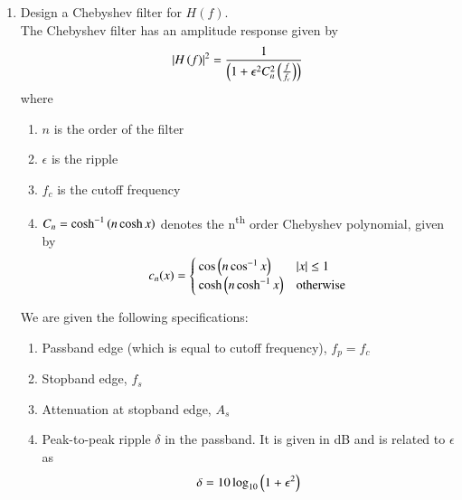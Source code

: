 \documentclass[journal,12pt,twocolumn]{IEEEtran}
\renewcommand\thesection{\arabic{section}}
\begin{document}
\begin{enumerate}[label=\thesection.\arabic*
,ref=\thesection.\theenumi]
Hence, we take $n = 3$. Solving for $f_c$ in \eqref{eq:fc1} and
\eqref{eq:fc2},
\begin{align}
    f_{c1} = f_p\sbrak{10^{-\frac{A_p}{10}} - 1}^{-\frac{1}{2n}} = \SI[parse-numbers=false]{46.67}{\hertz} \\
    f_{c2} = f_s\sbrak{10^{-\frac{A_s}{10}} - 1}^{-\frac{1}{2n}} = \SI[parse-numbers=false]{46.49}{\hertz}
\end{align}
Hence, we take $f_c = \sqrt{f_{c1}f_{c2}} = \SI[parse-numbers=false]{46.58}{\hertz}$ 
\item Design a Chebyshev filter for $H(f)$.\\
\solution The Chebyshev filter has an amplitude response
given by
\begin{align}
    \left\vert H\left(f\right)\right\vert^2 = \frac{1}{\left(1 + \epsilon^2C_n^2\left(\frac{f}{f_c}\right)\right)}
\end{align}
where 
\begin{enumerate}
    \item $n$ is the order of the filter
    \item $\epsilon$ is the ripple
    \item $f_c$ is the cutoff frequency 
    \item $C_n = \cosh^{-1}\left(n\cosh{x}\right)$ denotes 
    the n\textsuperscript{th} order Chebyshev polynomial,
    given by
    \begin{align}
        c_n(x) =
        \begin{cases}
            \cos\left(n\cos^{-1}x\right) & \left\vert x\right\vert \le 1 \\
            \cosh\left(n\cosh^{-1}x\right) & \textrm{otherwise}
        \end{cases}
        \label{eq:chebypol}
    \end{align}
\end{enumerate}
We are given the following specifications:
\begin{enumerate}
    \item Passband edge (which is equal to 
    cutoff frequency), $f_p = f_c$
    \item Stopband edge, $f_s$
    \item Attenuation at stopband edge, $A_s$
    \item Peak-to-peak ripple $\delta$ in the passband.
    It is given in dB and is related to $\epsilon$ as
    \begin{align}
        \delta = 10\log_{10}\left(1 + \epsilon^2\right)
        \label{eq:delta-eps}
    \end{align}
\end{enumerate}

\end{enumerate}
\end{document}
